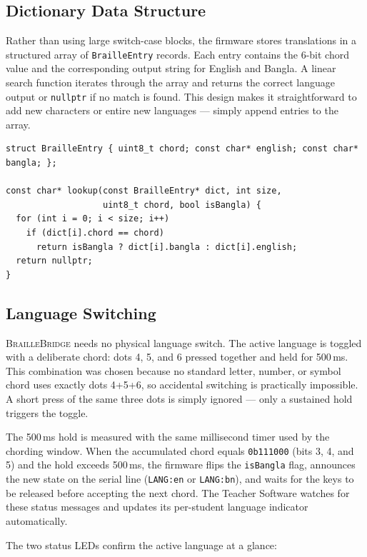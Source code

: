 \documentclass[11pt,a4paper,twoside]{article}
\newcommand{\projectname}{\textsc{BrailleBridge}}
\begin{document}
\subsection{Dictionary Data Structure}
Rather than using large switch-case blocks, the firmware stores translations
in a structured array of \texttt{BrailleEntry} records. Each entry contains
the 6-bit chord value and the corresponding output string for English and
Bangla. A linear search function iterates through the array and returns the
correct language output or \texttt{nullptr} if no match is found. This design
makes it straightforward to add new characters or entire new languages ---
simply append entries to the array.

\begin{lstlisting}[caption=Braille dictionary entry and lookup.]
struct BrailleEntry { uint8_t chord; const char* english; const char* bangla; };

const char* lookup(const BrailleEntry* dict, int size,
                   uint8_t chord, bool isBangla) {
  for (int i = 0; i < size; i++)
    if (dict[i].chord == chord)
      return isBangla ? dict[i].bangla : dict[i].english;
  return nullptr;
}
\end{lstlisting}

\subsection{Language Switching}
\projectname{} needs no physical language switch. The active language is
toggled with a deliberate chord: dots 4, 5, and 6 pressed together and
held for 500\,ms. This combination was chosen because no standard
letter, number, or symbol chord uses exactly dots 4+5+6, so accidental
switching is practically impossible. A short press of the same three
dots is simply ignored --- only a sustained hold triggers the toggle.

The 500\,ms hold is measured with the same millisecond timer used by the
chording window. When the accumulated chord equals \texttt{0b111000}
(bits 3, 4, and 5) and the hold exceeds 500\,ms, the firmware flips the
\texttt{isBangla} flag, announces the new state on the serial line
(\texttt{LANG:en} or \texttt{LANG:bn}), and waits for the keys to be
released before accepting the next chord. The Teacher Software watches
for these status messages and updates its per-student language
indicator automatically.

The two status LEDs confirm the active language at a glance:
\end{document}
